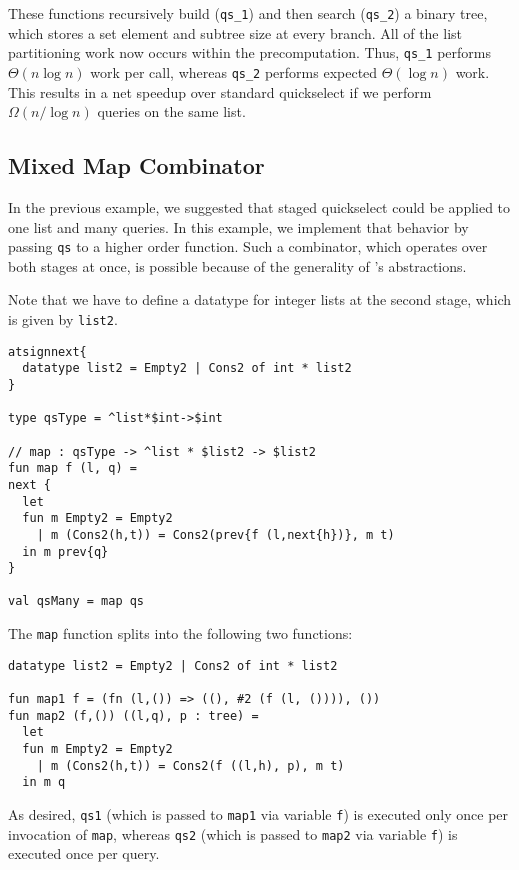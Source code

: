 These functions recursively build ({\tt qs\_1}) and then search ({\tt qs\_2}) a binary tree,
which stores a set element and subtree size at every branch.
All of the list partitioning work now occurs within the precomputation.
Thus, {\tt qs\_1} performs $\Theta(n \log n)$ work per call, whereas {\tt qs\_2} performs expected $\Theta(\log n)$ work.
This results in a net speedup over standard quickselect if we perform $\Omega(n / \log n)$ queries on the same list. 

\subsection {Mixed Map Combinator}

In the previous example, we suggested that staged quickselect could be applied to one list and many queries.
In this example, we implement that behavior by passing \texttt{qs} to a higher order function.
Such a combinator, which operates over both stages at once, is possible because of the generality of \lang's abstractions.

Note that we have to define a datatype for integer lists at the second stage, which is given by \texttt{list2}.
\begin{lstlisting} 
atsignnext{
  datatype list2 = Empty2 | Cons2 of int * list2
}

type qsType = ^list*$int->$int

// map : qsType -> ^list * $list2 -> $list2
fun map f (l, q) = 
next {
  let 
  fun m Empty2 = Empty2
    | m (Cons2(h,t)) = Cons2(prev{f (l,next{h})}, m t)
  in m prev{q}
}

val qsMany = map qs
\end{lstlisting}
The \texttt{map} function splits into the following two functions:
\begin{lstlisting} 
datatype list2 = Empty2 | Cons2 of int * list2

fun map1 f = (fn (l,()) => ((), #2 (f (l, ()))), ())
fun map2 (f,()) ((l,q), p : tree) =
  let 
  fun m Empty2 = Empty2
    | m (Cons2(h,t)) = Cons2(f ((l,h), p), m t) 
  in m q
\end{lstlisting}

As desired, \texttt{qs1} (which is passed to \texttt{map1} via variable \texttt{f}) is executed only once per invocation of \texttt{map},
whereas \texttt{qs2} (which is passed to \texttt{map2} via variable \texttt{f}) is executed once per query.